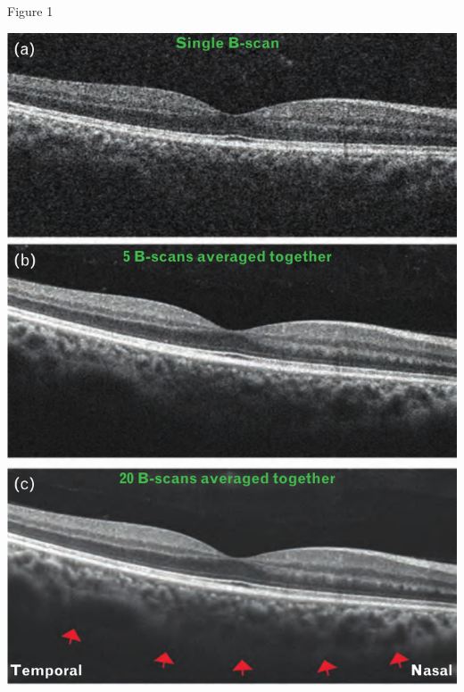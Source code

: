 \documentclass{beamer}
\begin{document}
\begin{frame}{Figure 1}
    \begin{center}
        \includegraphics[height=0.8\textheight]{1.png}
    \end{center}
\end{frame}
\end{document}
